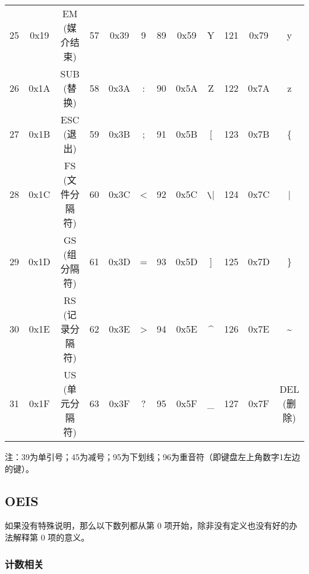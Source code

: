 \documentclass[a4paper, twoside]{article}
\begin{document}
\begin{table}[h]
\begin{tabular}{|c c c|c c c|c c c|c c c|}
        25  & 0x19 & EM (媒介结束)     & 57  & 0x39 & 9          & 89  & 0x59 & Y           & 121  & 0x79 & y            \\
        26  & 0x1A & SUB (替换)        & 58  & 0x3A & :          & 90  & 0x5A & Z           & 122  & 0x7A & z            \\
        27  & 0x1B & ESC (退出)        & 59  & 0x3B & ;          & 91  & 0x5B & [           & 123  & 0x7B & \{           \\
        28  & 0x1C & FS (文件分隔符)   & 60  & 0x3C & <          & 92  & 0x5C & \verb|\|    & 124  & 0x7C & |            \\
        29  & 0x1D & GS (组分隔符)     & 61  & 0x3D & =          & 93  & 0x5D & ]           & 125  & 0x7D & \}           \\
        30  & 0x1E & RS (记录分隔符)   & 62  & 0x3E & >          & 94  & 0x5E & \^{}        & 126  & 0x7E & \~{}         \\
        31  & 0x1F & US (单元分隔符)   & 63  & 0x3F & ?          & 95  & 0x5F & \_          & 127  & 0x7F & DEL (删除)    \\
        \hline
    \end{tabular}
\end{table}

注：39为单引号；45为减号；95为下划线；96为重音符（即键盘左上角数字1左边的键）。

\newpage
\subsection{OEIS}
\label{OEIS}

如果没有特殊说明，那么以下数列都从第 $0$ 项开始，除非没有定义也没有好的办法解释第 $0$ 项的意义。

    \subsubsection{计数相关}
\end{document}
